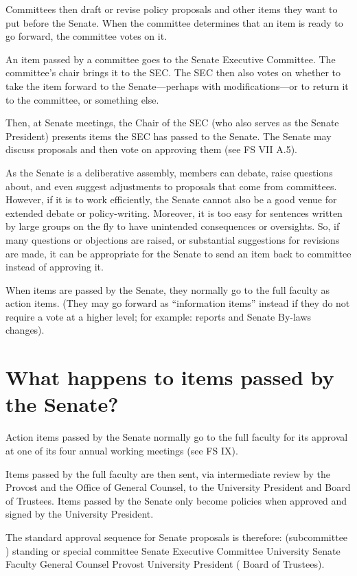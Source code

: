 \documentclass[12pt]{article}
\begin{document}
Committees then draft or revise policy proposals and other items they
want to put before the Senate. When the committee determines that an
item is ready to go forward, the committee votes on it.

An item passed by a committee goes to the Senate Executive Committee.
The committee's chair brings it to the SEC. The SEC then also votes on
whether to take the item forward to the Senate---perhaps with
modifications---or to return it to the committee, or something else.

Then, at Senate meetings, the Chair of the SEC (who also serves as the
Senate President) presents items the SEC has passed to the Senate. The
Senate may discuss proposals and then vote on approving them (see FS VII
A.5).

As the Senate is a deliberative assembly, members can debate, raise
questions about, and even suggest adjustments to proposals that come
from committees. However, if it is to work efficiently, the Senate
cannot also be a good venue for extended debate or policy-writing.
Moreover, it is too easy for sentences written by large groups on the
fly to have unintended consequences or oversights. So, if many questions
or objections are raised, or substantial suggestions for revisions are
made, it can be appropriate for the Senate to send an item back to
committee instead of approving it.

When items are passed by the Senate, they normally go to the full
faculty as action items. (They may go forward as “information items” instead if they do not require a vote at a higher level; for example: reports and Senate By-laws changes).

\section{What happens to items passed by the
Senate?}\label{what-happens-to-items-passed-by-the-senate}

Action items passed by the Senate normally go to the full faculty for
its approval at one of its four annual working meetings (see FS IX).

Items passed by the full faculty are then sent, via intermediate review
by the Provost and the Office of General Counsel, to the University
President and Board of Trustees. Items passed by the Senate only become
policies when approved and signed by the University President.

The standard approval sequence for Senate proposals is therefore:
(subcommittee \rightarrow{}) standing or special committee
\rightarrow{} Senate Executive Committee \rightarrow{} University Senate
\rightarrow{} Faculty \rightarrow{} General Counsel \rightarrow{}
Provost \rightarrow{} University President ( \rightarrow{} Board of
Trustees).
\end{document}
